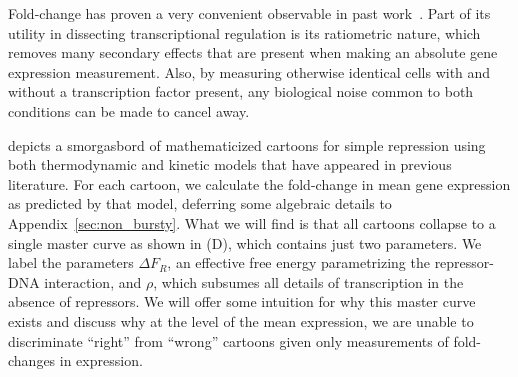 Fold-change has proven a very convenient observable in past
work~\cite{Garcia2011a, Brewster2014, Razo-Mejia2018, Chure2019}. Part of its
utility in dissecting transcriptional regulation is its ratiometric nature,
which removes many secondary effects that are present when making an absolute
gene expression measurement. Also, by measuring otherwise identical cells with
and without a transcription factor present, any biological noise common to both
conditions can be made to cancel away.

 depicts a smorgasbord of mathematicized cartoons for
simple repression using both thermodynamic and kinetic models that have appeared
in previous literature. For each cartoon, we calculate the fold-change in mean
gene expression as predicted by that model, deferring some algebraic details to
Appendix~\ref{sec:non_bursty}. What we will find is that all cartoons collapse
to a single master curve as shown in (D), which
contains just two parameters. We label the parameters $\Delta F_R$, an effective
free energy parametrizing the repressor-DNA interaction, and $\rho$, which
subsumes all details of transcription in the absence of repressors. We will
offer some intuition for why this master curve exists and discuss why at the
level of the mean expression, we are unable to discriminate ``right'' from
``wrong'' cartoons given only measurements of fold-changes in expression.

